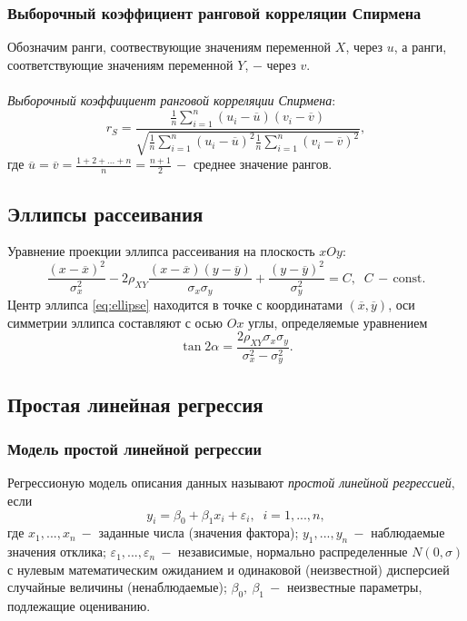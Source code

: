 \documentclass[a4paper]{article}
\begin{document}
\subsubsection{Выборочный коэффициент ранговой корреляции Спирмена}
Обозначим ранги, соотвествующие значениям переменной $X$, через $u$, а ранги, соответствующие значениям переменной $Y$, $-$ через $v$.
\\\\
\textit{Выборочный коэффициент ранговой корреляции Спирмена}:
\begin{equation}
    r_S=\frac{\frac{1}{n}\sum_{i=1}^n \left(u_i-\overline{u}\right)\left(v_i-\overline{v}\right)}{\sqrt{\frac{1}{n}\sum_{i=1}^n\left(u_i-\overline{u}\right)^2 \frac{1}{n}\sum_{i=1}^n\left(v_i-\overline{v}\right)^2}},
\end{equation}
где $\overline{u}=\overline{v}=\frac{1+2+...+n}{n}=\frac{n+1}{2}\,-$ среднее значение рангов.
\subsection{Эллипсы рассеивания}
Уравнение проекции эллипса рассеивания на плоскость $xOy$:
\begin{equation}\label{eq:ellipse}
    \frac{\left(x-\overline{x}\right)^2}{\sigma_x^2}-2\rho_{XY}^{}\frac{(x-\overline{x})(y-\overline{y})}{\sigma_x\sigma_y}+\frac{\left(y-\overline{y}\right)^2}{\sigma_y^2}=C,\;\;C\,-\,\text{const}.
\end{equation}
Центр эллипса \eqref{eq:ellipse} находится в точке с координатами $(\overline{x},\overline{y})$, оси симметрии эллипса составляют с осью $Ox$ углы, определяемые уравнением
\begin{equation}
    \tan{2\alpha}=\frac{2\rho_{XY}^{}\sigma_x\sigma_y}{\sigma_x^2-\sigma_y^2}.
\end{equation}
\subsection{Простая линейная регрессия}
\subsubsection{Модель простой линейной регрессии}
Регрессионую модель описания данных называют \textit{простой линейной регрессией}, если
\begin{equation}
    y_i=\beta_0 + \beta_1 x_i + \varepsilon_i,\;\;i=1,...,n,
\end{equation}
где $x_1, ..., x_n\:-$ заданные числа (значения фактора); $y_1,...,y_n\:-$ наблюдаемые значения отклика; $\varepsilon_1,...,\varepsilon_n\:-$ независимые, нормально распределенные $N(0,\sigma)$ с нулевым математическим ожиданием и одинаковой (неизвестной) дисперсией случайные величины (ненаблюдаемые); $\beta_0,\:\beta_1\:-$ неизвестные параметры, подлежащие оцениванию.
\end{document}
